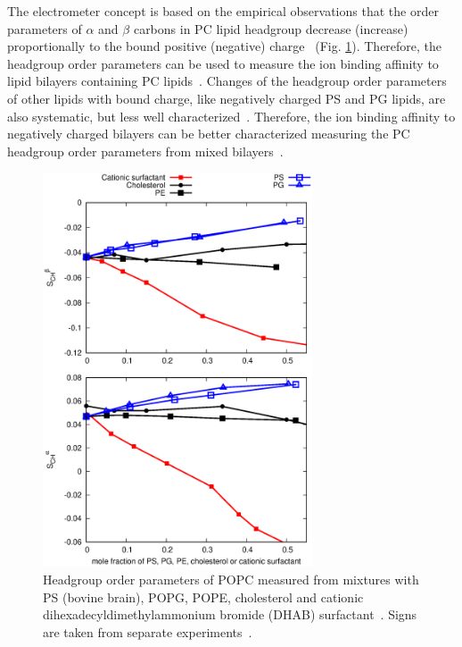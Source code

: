 \documentclass[journal=jpcbfk]{achemso}
\begin{document}
The electrometer concept is based on the empirical observations that
the order parameters of $\alpha$ and $\beta$ carbons in PC lipid headgroup
decrease (increase) proportionally to the bound positive (negative) 
charge~\cite{akutsu81,altenbach84,seelig87,scherer89} (Fig. \ref{HGorderparametersPCvsPEPSPGchol}). 
Therefore, the headgroup order parameters can be used to measure the
ion binding affinity to lipid bilayers containing PC
lipids~\cite{akutsu81,altenbach84,borle85,seelig87,macdonald87,roux90}.
Changes of the headgroup order parameters of other lipids with bound charge,
like negatively charged PS and PG lipids,  are also systematic,
but less well characterized~\cite{borle85,macdonald87,roux86,roux90}.
Therefore, the ion binding affinity to negatively charged bilayers
can be better characterized measuring the PC headgroup order parameters from 
mixed bilayers~\cite{borle85,roux86,macdonald87,roux90,roux91}.
\begin{figure}[]
  \centering
  \includegraphics[width=8.0cm]{../Figs/HGorderparametersPCvsPEPSPGchol.eps}
  \caption{\label{HGorderparametersPCvsPEPSPGchol}
    Headgroup order parameters of POPC measured from mixtures with
    PS (bovine brain), POPG, POPE, cholesterol and cationic dihexadecyldimethylammonium bromide (DHAB) surfactant~\cite{scherer87,scherer89,ferreira13}.
    Signs are taken from separate experiments~\cite{ollila16,ferreira16}.
  }
\end{figure}
\end{document}
